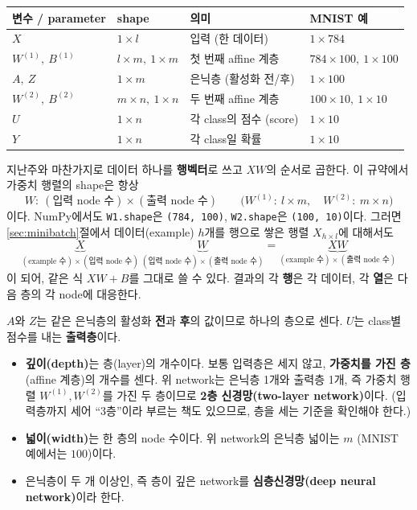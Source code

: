 \documentclass[11pt,a4paper]{article}
\begin{document}
\begin{center}
\begin{tabular}{@{}llll@{}}
\toprule
변수 / parameter & shape & 의미 & MNIST 예 \\
\midrule
$X$ & $1\times l$ & 입력 (한 데이터) & $1\times784$ \\
$W^{(1)},\ B^{(1)}$ & $l\times m,\ 1\times m$ & 첫 번째 affine 계층 & $784\times100,\ 1\times100$ \\
$A,\ Z$ & $1\times m$ & 은닉층 (활성화 전/후) & $1\times100$ \\
$W^{(2)},\ B^{(2)}$ & $m\times n,\ 1\times n$ & 두 번째 affine 계층 & $100\times10,\ 1\times10$ \\
$U$ & $1\times n$ & 각 class의 점수 (score) & $1\times10$ \\
$Y$ & $1\times n$ & 각 class일 확률 & $1\times10$ \\
\bottomrule
\end{tabular}
\end{center}

지난주와 마찬가지로 데이터 하나를 \textbf{행벡터}로 쓰고 $XW$의 순서로 곱한다.
이 규약에서 가중치 행렬의 shape은 항상
\[
\boxed{
W:\ (\text{입력 node 수})\times(\text{출력 node 수})
}
\qquad
\bigl(W^{(1)}:\ l\times m,\quad W^{(2)}:\ m\times n\bigr)
\]
이다. NumPy에서도 \texttt{W1.shape}은 \texttt{(784, 100)}, \texttt{W2.shape}은 \texttt{(100, 10)}이다.
그러면 \ref{sec:minibatch}절에서 데이터(example) $h$개를 행으로 쌓은 행렬 $X_{h\times l}$에 대해서도
\[
\underbrace{X}_{(\text{example 수})\times(\text{입력 node 수})}\
\underbrace{W}_{(\text{입력 node 수})\times(\text{출력 node 수})}
=\underbrace{XW}_{(\text{example 수})\times(\text{출력 node 수})}
\]
이 되어, 같은 식 $XW+B$를 그대로 쓸 수 있다.
결과의 각 \textbf{행}은 각 데이터, 각 \textbf{열}은 다음 층의 각 node에 대응한다.

\begin{remarkbox}
$A$와 $Z$는 같은 은닉층의 활성화 \textbf{전}과 \textbf{후}의 값이므로 하나의 층으로 센다.
$U$는 class별 점수를 내는 \textbf{출력층}이다.
\begin{itemize}[leftmargin=1.8em]
\item \textbf{깊이(depth)}는 층(layer)의 개수이다.
보통 입력층은 세지 않고, \textbf{가중치를 가진 층}(affine 계층)의 개수를 센다.
위 network는 은닉층 1개와 출력층 1개, 즉 가중치 행렬 $W^{(1)}, W^{(2)}$를 가진 두 층이므로
\textbf{2층 신경망(two-layer network)}이다.
(입력층까지 세어 ``3층''이라 부르는 책도 있으므로, 층을 세는 기준을 확인해야 한다.)
\item \textbf{넓이(width)}는 한 층의 node 수이다.
위 network의 은닉층 넓이는 $m$ (MNIST 예에서는 $100$)이다.
\item 은닉층이 두 개 이상인, 즉 층이 깊은 network를 \textbf{심층신경망(deep neural network)}이라 한다.
\end{itemize}
\end{remarkbox}
\end{document}
